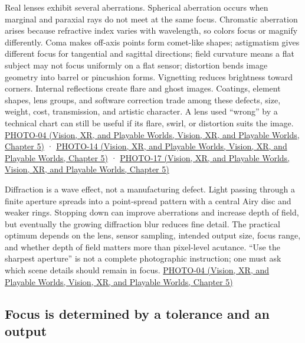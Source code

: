 Real lenses exhibit several aberrations. Spherical aberration occurs when marginal and paraxial rays do not meet at the same focus. Chromatic aberration arises because refractive index varies with wavelength, so colors focus or magnify differently. Coma makes off-axis points form comet-like shapes; astigmatism gives different focus for tangential and sagittal directions; field curvature means a flat subject may not focus uniformly on a flat sensor; distortion bends image geometry into barrel or pincushion forms. Vignetting reduces brightness toward corners. Internal reflections create flare and ghost images. Coatings, element shapes, lens groups, and software correction trade among these defects, size, weight, cost, transmission, and artistic character. A lens used ``wrong'' by a technical chart can still be useful if its flare, swirl, or distortion suits the image. \href{../07-Vision-XR-and-Playable-Worlds/main.pdf\#nameddest=04-visual-computing-ii-ch036-photo-04---photography-session-04}{PHOTO-04 (Vision, XR, and Playable Worlds, Vision, XR, and Playable Worlds, Chapter 5)} · \href{../07-Vision-XR-and-Playable-Worlds/main.pdf\#nameddest=04-visual-computing-ii-ch036-photo-14---photography-session-14}{PHOTO-14 (Vision, XR, and Playable Worlds, Vision, XR, and Playable Worlds, Chapter 5)} · \href{../07-Vision-XR-and-Playable-Worlds/main.pdf\#nameddest=04-visual-computing-ii-ch036-photo-17---photography-session-17}{PHOTO-17 (Vision, XR, and Playable Worlds, Vision, XR, and Playable Worlds, Chapter 5)}

Diffraction is a wave effect, not a manufacturing defect. Light passing through a finite aperture spreads into a point-spread pattern with a central Airy disc and weaker rings. Stopping down can improve aberrations and increase depth of field, but eventually the growing diffraction blur reduces fine detail. The practical optimum depends on the lens, sensor sampling, intended output size, focus range, and whether depth of field matters more than pixel-level acutance. ``Use the sharpest aperture'' is not a complete photographic instruction; one must ask which scene details should remain in focus. \href{../07-Vision-XR-and-Playable-Worlds/main.pdf\#nameddest=04-visual-computing-ii-ch036-photo-04---photography-session-04}{PHOTO-04 (Vision, XR, and Playable Worlds, Vision, XR, and Playable Worlds, Chapter 5)}

\subsection{Focus is determined by a tolerance and an output}\label{03-visual-computing-i-ch003-focus-is-determined-by-a-tolerance-and-an-output}

